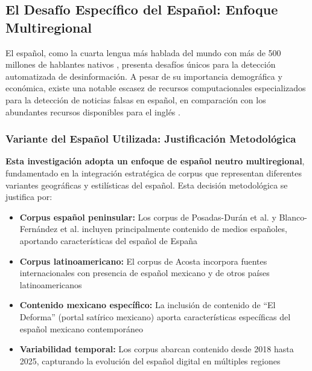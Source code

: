 \subsection{El Desafío Específico del Español: Enfoque Multiregional}

El español, como la cuarta lengua más hablada del mundo con más de 500 millones de hablantes nativos \cite{acosta2019construccion}, presenta desafíos únicos para la detección automatizada de desinformación. A pesar de su importancia demográfica y económica, existe una notable escasez de recursos computacionales especializados para la detección de noticias falsas en español, en comparación con los abundantes recursos disponibles para el inglés \cite{posadas2019detection}.

\subsubsection{Variante del Español Utilizada: Justificación Metodológica}

\textbf{Esta investigación adopta un enfoque de español neutro multiregional}, fundamentado en la integración estratégica de corpus que representan diferentes variantes geográficas y estilísticas del español. Esta decisión metodológica se justifica por:

\begin{itemize}
    \item \textbf{Corpus español peninsular:} Los corpus de Posadas-Durán et al. \cite{posadas2019detection} y Blanco-Fernández et al. \cite{blanco2024enhancing} incluyen principalmente contenido de medios españoles, aportando características del español de España
    
    \item \textbf{Corpus latinoamericano:} El corpus de Acosta \cite{acosta2019construccion} incorpora fuentes internacionales con presencia de español mexicano y de otros países latinoamericanos
    
    \item \textbf{Contenido mexicano específico:} La inclusión de contenido de ``El Deforma'' (portal satírico mexicano) aporta características específicas del español mexicano contemporáneo
    
    \item \textbf{Variabilidad temporal:} Los corpus abarcan contenido desde 2018 hasta 2025, capturando la evolución del español digital en múltiples regiones
\end{itemize}

